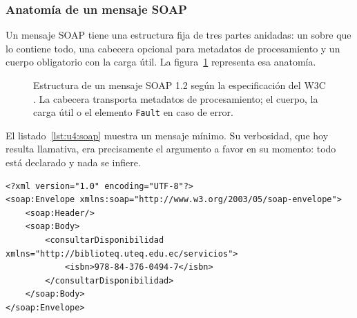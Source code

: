 \documentclass[11pt,a4paper,openany]{book}
\begin{document}
\subsubsection{Anatomía de un mensaje SOAP}

Un mensaje SOAP tiene una estructura fija de tres partes anidadas: un sobre que lo contiene todo, una cabecera opcional para metadatos de procesamiento y un cuerpo obligatorio con la carga útil. La figura~\ref{fig:u4:soap} representa esa anatomía.

\begin{figure}[htbp]
	\centering
	\caption{Estructura de un mensaje SOAP 1.2 según la especificación del W3C \cite{w3c2007soap12}. La cabecera transporta metadatos de procesamiento; el cuerpo, la carga útil o el elemento \texttt{Fault} en caso de error.}
	\label{fig:u4:soap}
\end{figure}

El listado~\ref{lst:u4:soap} muestra un mensaje mínimo. Su verbosidad, que hoy resulta llamativa, era precisamente el argumento a favor en su momento: todo está declarado y nada se infiere.

\begin{lstlisting}[style=xml,caption={Mensaje SOAP 1.2 minimo de consulta de disponibilidad.},label={lst:u4:soap}]
<?xml version="1.0" encoding="UTF-8"?>
<soap:Envelope xmlns:soap="http://www.w3.org/2003/05/soap-envelope">
	<soap:Header/>
	<soap:Body>
		<consultarDisponibilidad xmlns="http://biblioteq.uteq.edu.ec/servicios">
			<isbn>978-84-376-0494-7</isbn>
		</consultarDisponibilidad>
	</soap:Body>
</soap:Envelope>
\end{lstlisting}
\end{document}
